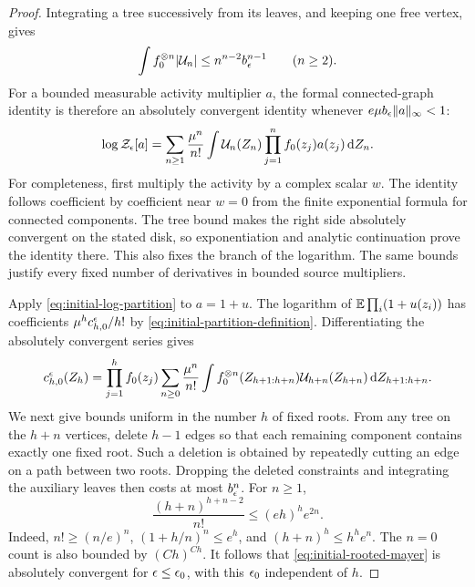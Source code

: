 \begin{proof}
Integrating a tree successively from its leaves, and keeping one free
vertex, gives
\begin{equation}\label{eq:initial-unrooted-tree-integral}
 \int f_0^{\otimes n}|\mathcal U_n|
 \le n^{n-2}b_\epsilon^{n-1}\qquad(n\ge2).
\end{equation}
For a bounded measurable activity multiplier $a$, the formal
connected-graph identity is therefore an absolutely convergent
identity whenever $e\mu b_\epsilon\|a\|_\infty<1$:
\begin{equation}\label{eq:initial-log-partition}
 \log\mathcal Z_\epsilon[a]
  =\sum_{n\ge1}\frac{\mu^n}{n!}
    \int\mathcal U_n(Z_n)\prod_{j=1}^n f_0(z_j)a(z_j)\,\mathrm d Z_n.
\end{equation}
For completeness, first multiply the activity by a complex scalar
$w$.  The identity follows coefficient by coefficient near $w=0$
from the finite exponential formula for connected components.  The
tree bound makes the right side absolutely convergent on the stated
disk, so exponentiation and analytic continuation prove the identity
there.  This also fixes the branch of the logarithm.  The same bounds
justify every fixed number of derivatives in bounded source
multipliers.

Apply \eqref{eq:initial-log-partition} to $a=1+u$.  The logarithm of
$\mathbb E\prod_i(1+u(z_i))$ has coefficients $\mu^h c_{h,0}^{\epsilon}/h!$ by
\eqref{eq:initial-partition-definition}.  Differentiating the
absolutely convergent series gives
\begin{equation}\label{eq:initial-rooted-mayer}
 c_{h,0}^{\epsilon}(Z_h)
 =\prod_{j=1}^h f_0(z_j)
   \sum_{n\ge0}\frac{\mu^n}{n!}
      \int f_0^{\otimes n}(Z_{h+1:h+n})
         \mathcal U_{h+n}(Z_{h+n})\,\mathrm d Z_{h+1:h+n}.
\end{equation}
We next give bounds uniform in the number $h$ of fixed roots.
From any tree on the $h+n$ vertices, delete $h-1$ edges so that each
remaining component contains exactly one fixed root.  Such a deletion
is obtained by repeatedly cutting an edge on a path between two roots.
Dropping the deleted constraints and integrating the auxiliary leaves
then costs at most $b_\epsilon^n$.  For $n\ge1$,
\begin{equation}\label{eq:initial-rooted-count}
 \frac{(h+n)^{h+n-2}}{n!}
 \le (eh)^h e^{2n}.
\end{equation}
Indeed, $n!\ge(n/e)^n$,
$(1+h/n)^n\le e^h$, and $(h+n)^h\le h^h e^n$.
The $n=0$ count is also bounded by $(Ch)^{Ch}$.
It follows that \eqref{eq:initial-rooted-mayer} is absolutely convergent
for $\epsilon\le\epsilon_0$, with this $\epsilon_0$ independent of $h$.


\end{proof}
